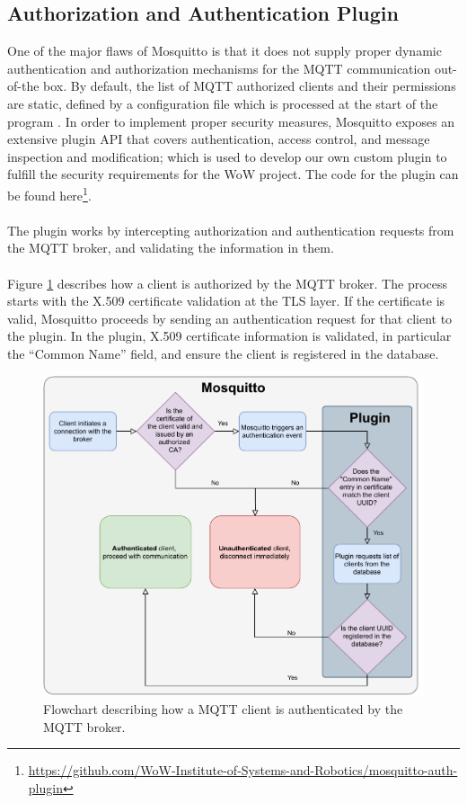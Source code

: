 \subsection{Authorization and Authentication Plugin}
\label{sec:auth_plugin}

One of the major flaws of Mosquitto is that it does not supply proper dynamic authentication and authorization mechanisms for the \acs{MQTT} communication out-of-the box. By default, the list of \acs{MQTT} authorized clients and their permissions are static, defined by a configuration file which is processed at the start of the program \cite{mosquitto}. In order to implement proper security measures, Mosquitto exposes an extensive plugin \acs{API} \cite{mosquitto} that covers authentication, access control, and message inspection and modification; which is used to develop our own custom plugin to fulfill the security requirements for the \acs{WoW} project. The code for the plugin can be found here\footnote{\url{https://github.com/WoW-Institute-of-Systems-and-Robotics/mosquitto-auth-plugin}}.

\paragraph{} The plugin works by intercepting authorization and authentication requests from the \acs{MQTT} broker, and validating the information in them. 

\paragraph{} Figure \ref{fig:mqtt-plugin-authnflow} describes how a client is authorized by the \acs{MQTT} broker. The process starts with the X.509 certificate validation at the \acs{TLS} layer. If the certificate is valid, Mosquitto proceeds by sending an authentication request for that client to the plugin. In the plugin, X.509 certificate information is validated, in particular the ``Common Name'' field, and ensure the client is registered in the database.

\begin{figure}[H]
    \centering
    \includegraphics[width=0.7\linewidth]{images/mqtt authentication.pdf}
    \caption{Flowchart describing how a \acs{MQTT} client is authenticated by the \acs{MQTT} broker.}
    \label{fig:mqtt-plugin-authnflow}
\end{figure}

